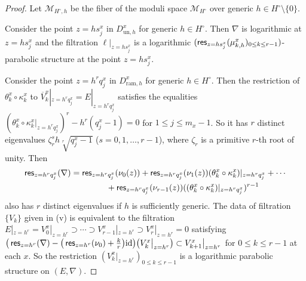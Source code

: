 \documentclass[pdftex]{sigma}
\numberwithin{equation}{section}
\newcommand{\res}{\mathop{\sf res}\nolimits}
\begin{document}
\begin{proof}
Let
${\mathcal M}_{H^{\circ},h}$
be the fiber of the moduli space ${\mathcal M}_{H^{\circ}}$ over
generic $h\in H^{\circ}\setminus\{0\}$.

Consider the point $z=hs^x_j$ in $D^x_{\mathrm{un},h}$ for generic $h\in H^{\circ}$.
Then $\nabla$ is logarithmic at $z=hs^x_j$ and the filtration
$\ell|_{z=hs^x_j}$ is a logarithmic
$(\res_{z=hs^x_j}(\mu^x_{k,h})_{0\leq k\leq r-1})$-parabolic structure
at the point $z=hs^x_j$.

Consider the point $z=h^rq^x_j$ in $D^x_{\mathrm{ram},h}$
for generic $h\in H^{\circ}$.
Then the restriction
of $\theta^x_k\circ\kappa^x_k$ to
$\overline{V}^x_k|_{z=h^rq^x_j}=E|_{z=h^rq^x_j}$ satisfies
the equalities
$(\theta^x_k\circ\kappa^x_k|_{z=h^rq^x_j})^r-h^r(q^x_j-1)=0$
for $1\leq j \leq m_x-1$.
So it has $r$ distinct eigenvalues
$\zeta_r^sh\sqrt[r]{q^x_j-1}$ ($s=0,1,\dots,r-1$),
where $\zeta_r$ is a primitive $r$-th root of unity.
Then
\begin{gather*}
 \res_{z=h^rq^x_j}(\nabla)=
 \res_{z=h^rq^x_j}(\nu_0(z))
 + \res_{z=h^rq^x_j}(\nu_1(z))(\theta^x_k\circ\kappa^x_k)|_{z=h^rq^x_j}
 +\cdots
 \\
\hphantom{\res_{z=h^rq^x_j}(\nabla)=}{}
 + \res_{z=h^rq^x_j}(\nu_{r-1}(z))((\theta^x_k\circ\kappa^x_k)|_{z=h^rq^x_j})^{r-1}
\end{gather*}
also has $r$ distinct eigenvalues if $h$ is sufficiently generic.
The data of filtration $\{V_k\}$ given in (v) is equivalent to
the filtration
$E|_{z=h^r}=V^x_0|_{z=h^r}\supset\cdots\supset V^x_{r-1}|_{z=h^r}
\supset V^x_r|_{z=h^r}=0$
satisfying
$\big(\res_{z=h^r}(\nabla)-\big(\res_{z=h^r}(\nu_0)+\frac{k}{r}\big)\mathrm{id}\big)
\big(V^x_k\big|_{z=h^r}\big)\subset V^x_{k+1}\big|_{z=h^r}$
for $0\leq k\leq r-1$ at each $x$.
So the restriction
$(V^x_k|_{z=h^r})_{0\leq k\leq r-1}$
is a logarithmic parabolic structure on $(E,\nabla)$.


\end{proof}
\end{document}
